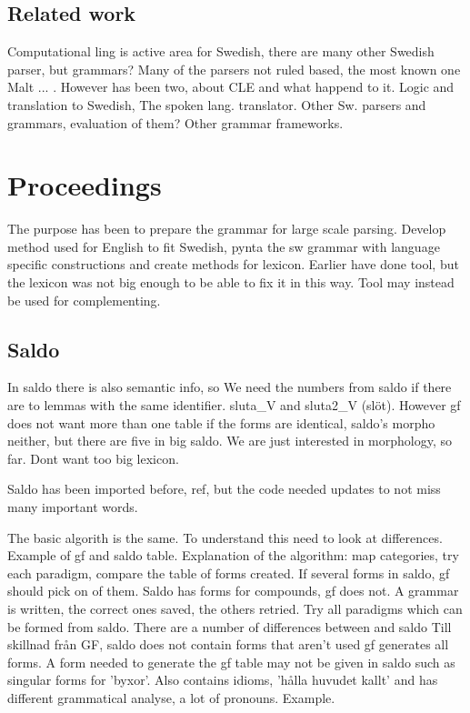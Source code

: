 \documentclass{report}
\begin{document}
\section{Related work}
Computational ling is active area for Swedish, there are many other Swedish parser,
but grammars?
Many of the parsers not ruled based, the most known one Malt ... .
However has been two, about CLE and what happend to it. Logic and translation
to Swedish, The spoken lang. translator.
Other Sw. parsers and grammars, evaluation of them? 
Other grammar frameworks.

\chapter{Proceedings}
 The purpose has been to prepare the grammar for large scale parsing.
 Develop method used for English to fit Swedish, pynta the sw grammar with
 language specific constructions and create methods for lexicon.
 Earlier have done tool, but the lexicon was not big enough to be able
 to fix it in this way. Tool may instead be used for complementing.

\section{Saldo}
In saldo there is also semantic info, so
We need the numbers from saldo if there are to lemmas with the same
identifier. sluta\_V and sluta2\_V (slöt). However gf does not want more than one table
if the forms are identical, saldo's morpho neither, but there are five in big saldo. 
We are just interested in morphology, so far. Dont want too big lexicon.

Saldo has been imported before, ref, but the code needed updates to not miss
many important words.

The basic algorith is the same. To understand this need to look at differences.
Example of gf and saldo table.
Explanation of the algorithm: map categories, try each paradigm, compare the table of forms
created. If several forms in saldo, gf should pick on of them. Saldo has forms for
compounds, gf does not. A grammar is written, the correct ones saved, the others 
retried. Try all paradigms which can be formed from saldo. 
There are a number of differences between and saldo Till skillnad från GF,
saldo does not contain forms that aren't used gf generates all forms. A form
needed to generate the gf table may not be given in saldo such as singular
forms for 'byxor'. Also contains idioms, 'hålla huvudet kallt' and has
different grammatical analyse, a lot of pronouns. Example. 
\end{document}
